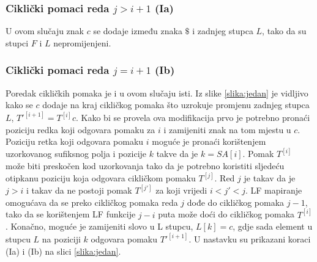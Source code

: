 \documentclass{ferseminar}
\begin{document}
\subsubsection{Ciklički pomaci reda $j>i+1$ (Ia)}
U ovom slučaju znak $c$ se dodaje između znaka $\$$ i zadnjeg stupca $L$, tako da su stupci $F$ i $L$ nepromijenjeni.

\subsubsection{Ciklički pomaci reda $j=i+1$ (Ib)}
Poredak cikličkih pomaka je i u ovom slučaju isti. Iz slike \ref{slika:jedan} je vidljivo kako se $c$ dodaje na kraj cikličkog pomaka što uzrokuje promjenu zadnjeg stupca $L$, $T'^{[i+1]}=T^{[i]}c$. Kako bi se provela ova modifikacija prvo je potrebno pronaći poziciju redka koji odgovara pomaku za $i$ i zamijeniti znak na tom mjestu u $c$. Poziciju retka koji odgovara pomaku  $i$ moguće je pronaći korištenjem uzorkovanog sufiksnog polja i pozicije $k$ takve da je $k=SA[i]$\cite{gonzalez2008improved}. Pomak $T^{[i]}$ može biti preskočen kod uzorkovanja tako da je potrebno koristiti sljedeću otipkanu poziciju koja odgovara cikličkom pomaku $T^{[j]}$. Red $j$ je takav da je $j>i$ i takav da ne postoji pomak $T^{[j']}$ za koji vrijedi $i<j'<j$. LF mapiranje omogućava da se preko cikličkog pomaka reda $j$ dođe do cikličkog pomaka $j-1$, tako da se korištenjem LF funkcije $j-i$ puta može doći do cikličkog pomaka $T^{[i]}$. Konačno, moguće je zamijeniti slovo u L stupcu, $L[k]=c$, gdje sada element u stupcu $L$ na poziciji $k$ odgovara pomaku $T'^{[i+1]}$.
U nastavku su prikazani koraci (Ia) i (Ib) na slici \ref{slika:jedan}.
\end{document}
